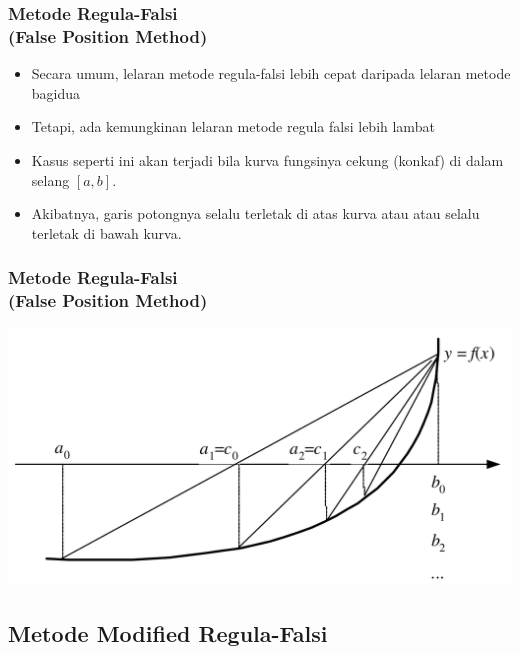 \documentclass[pdflatex,compress]{beamer}
\begin{document}
\begin{frame}
	\frametitle{Metode Regula-Falsi\\(False Position Method)}
	\begin{itemize}
		\item Secara umum, lelaran metode regula-falsi lebih cepat daripada lelaran metode bagidua
		\item Tetapi, ada kemungkinan lelaran metode regula falsi lebih lambat
		\item Kasus seperti ini akan terjadi bila kurva fungsinya cekung (konkaf) di dalam selang $ [a, b] $.
		\item Akibatnya, garis potongnya selalu terletak di atas kurva atau atau selalu terletak di bawah kurva.
	\end{itemize}
\end{frame}

\begin{frame}
	\frametitle{Metode Regula-Falsi\\(False Position Method)}
	\begin{center}
		\includegraphics[width=0.6\linewidth]{img/img11}
	\end{center}
\end{frame}

\subsection{Metode Modified Regula-Falsi}
\end{document}
